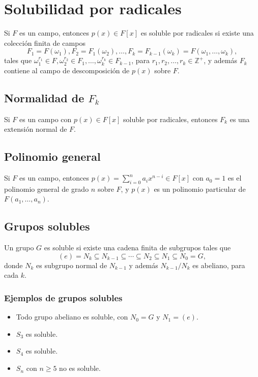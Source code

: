 \documentclass{article}
\begin{document}
\newpage

\section{Solubilidad por radicales}

Si $F$ es un campo, entonces $p(x)\in F[x]$ es soluble por radicales si existe una colección finita de campos 
$$F_1=F(\omega_1),F_2=F_1(\omega_2),\ldots,F_k=F_{k-1}(\omega_k)=F(\omega_1,\ldots,\omega_k),$$
tales que $\omega_1^{r_1}\in F,\omega_2^{r_2}\in F_1,\ldots,\omega_k^{r_k}\in F_{k-1}$, para $r_1,r_2,\ldots,r_k\in\mathbb{Z}^+$, y además $F_k$ contiene al campo de descomposición de $p(x)$ sobre $F$.

\subsection*{\color{purple} Normalidad de $F_k$}

Si $F$ es un campo con $p(x)\in F[x]$ soluble por radicales, entonces $F_k$ es una extensión normal de $F$.

\subsection*{\color{violet} Polinomio general}

Si $F$ es un campo, entonces $p(x)=\displaystyle\sum_{i=0}^n a_ix^{n-i}\in F[x]$ con $a_0=1$ es el polinomio general de grado $n$ sobre $F$, y $p(x)$ es un polinomio particular de $F(a_1,\ldots,a_n)$.

\subsection*{\color{violet} Grupos solubles}

Un grupo $G$ es soluble si existe una cadena finita de subgrupos tales que
$$(e)=N_k\subseteq N_{k-1}\subseteq\cdots\subseteq N_2\subseteq N_1\subseteq N_0=G,$$
donde $N_k$ es subgrupo normal de $N_{k-1}$ y además $N_{k-1}/N_k$ es abeliano, para cada $k$.

\subsubsection*{\color{teal} Ejemplos de grupos solubles}

\begin{itemize}

\item Todo grupo abeliano es soluble, con $N_0=G$ y $N_1=(e)$.

\item $S_3$ es soluble.

\item $S_4$ es soluble.

\item $S_n$ con $n\geq 5$ no es soluble.

\end{itemize}
\end{document}
